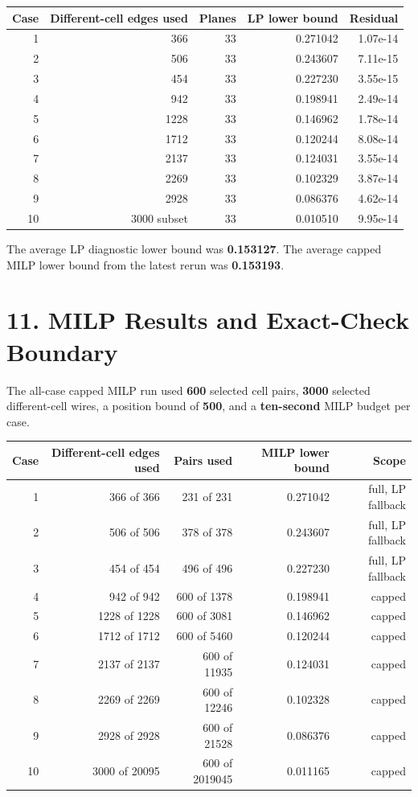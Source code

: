 \documentclass[11pt]{article}
\begin{document}
\begin{center}
\scriptsize
\begin{tabular}{rrrrr}
\toprule
Case & Different-cell edges used & Planes & LP lower bound & Residual \\
\midrule
1 & 366 & 33 & 0.271042 & 1.07e-14 \\
2 & 506 & 33 & 0.243607 & 7.11e-15 \\
3 & 454 & 33 & 0.227230 & 3.55e-15 \\
4 & 942 & 33 & 0.198941 & 2.49e-14 \\
5 & 1228 & 33 & 0.146962 & 1.78e-14 \\
6 & 1712 & 33 & 0.120244 & 8.08e-14 \\
7 & 2137 & 33 & 0.124031 & 3.55e-14 \\
8 & 2269 & 33 & 0.102329 & 3.87e-14 \\
9 & 2928 & 33 & 0.086376 & 4.62e-14 \\
10 & 3000 subset & 33 & 0.010510 & 9.95e-14 \\
\bottomrule
\end{tabular}
\end{center}

The average LP diagnostic lower bound was \textbf{0.153127}. The average capped MILP lower bound from the latest rerun was \textbf{0.153193}.

\newpage

\section{11. MILP Results and Exact-Check Boundary}

The all-case capped MILP run used \textbf{600} selected cell pairs, \textbf{3000} selected different-cell wires, a position bound of \textbf{500}, and a \textbf{ten-second} MILP budget per case.

\begin{center}
\scriptsize
\begin{tabular}{rrrrr}
\toprule
Case & Different-cell edges used & Pairs used & MILP lower bound & Scope \\
\midrule
1 & 366 of 366 & 231 of 231 & 0.271042 & full, LP fallback \\
2 & 506 of 506 & 378 of 378 & 0.243607 & full, LP fallback \\
3 & 454 of 454 & 496 of 496 & 0.227230 & full, LP fallback \\
4 & 942 of 942 & 600 of 1378 & 0.198941 & capped \\
5 & 1228 of 1228 & 600 of 3081 & 0.146962 & capped \\
6 & 1712 of 1712 & 600 of 5460 & 0.120244 & capped \\
7 & 2137 of 2137 & 600 of 11935 & 0.124031 & capped \\
8 & 2269 of 2269 & 600 of 12246 & 0.102328 & capped \\
9 & 2928 of 2928 & 600 of 21528 & 0.086376 & capped \\
10 & 3000 of 20095 & 600 of 2019045 & 0.011165 & capped \\
\bottomrule
\end{tabular}
\end{center}
\end{document}
